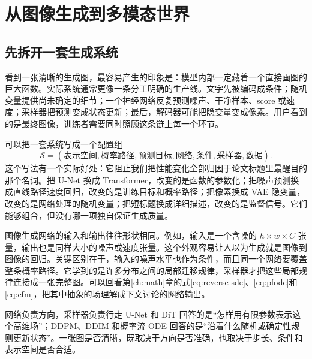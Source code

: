 \chapter{从图像生成到多模态世界}
\label{ch:applications}


\section{先拆开一套生成系统}
\label{sec:application-system}

看到一张清晰的生成图，最容易产生的印象是：模型内部一定藏着一个直接画图的巨大函数。实际系统通常更像一条分工明确的生产线。文字先被编码成条件；随机变量提供尚未确定的细节；一个神经网络反复预测噪声、干净样本、score 或速度；采样器把预测变成状态更新；最后，解码器可能把隐变量变成像素。用户看到的是最终图像，训练者需要同时照顾这条链上每一个环节。

可以把一套系统写成一个配置组
\[
\mathcal S=(\text{表示空间},\text{概率路径},\text{预测目标},
\text{网络},\text{条件},\text{采样器},\text{数据}).
\]
这个写法有一个实际好处：它阻止我们把性能变化全部归因于论文标题里最醒目的那个名词。把 U-Net 换成 Transformer，改变的是函数的参数化；把噪声预测换成直线路径速度回归，改变的是训练目标和概率路径；把像素换成 VAE 隐变量，改变的是网络处理的随机变量；把短标题换成详细描述，改变的是监督信号。它们能够组合，但没有哪一项独自保证生成质量。

图像生成网络的输入和输出往往形状相同。例如，输入是一个含噪的 $h\times w\times C$ 张量，输出也是同样大小的噪声或速度张量。这个外观容易让人以为生成就是图像到图像的回归。关键区别在于，输入的噪声水平也作为条件，而且同一个网络要覆盖整条概率路径。它学到的是许多分布之间的局部迁移规律，采样器才把这些局部规律连接成一张完整图。可以回看第\ref{ch:math}章的式\eqref{eq:reverse-sde}、\eqref{eq:pfode}和\eqref{eq:cfm}，把其中抽象的场理解成下文讨论的网络输出。

\begin{intuitionbox}{网络负责方向，采样器负责行走}
U-Net 和 DiT 回答的是“怎样用有限参数表示这个高维场”；DDPM、DDIM 和概率流 ODE 回答的是“沿着什么随机或确定性规则更新状态”。一张图是否清晰，既取决于方向是否准确，也取决于步长、条件和表示空间是否合适。
\end{intuitionbox}

